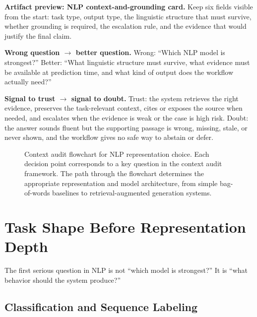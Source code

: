 \begin{thinkingtool}
\textbf{Artifact preview: NLP context-and-grounding card.} Keep six fields visible from the start: task type, output type, the linguistic structure that must survive, whether grounding is required, the escalation rule, and the evidence that would justify the final claim.
\end{thinkingtool}

\begin{thinkingtool}
\textbf{Wrong question $\rightarrow$ better question.} Wrong: ``Which NLP model is strongest?'' Better: ``What linguistic structure must survive, what evidence must be available at prediction time, and what kind of output does the workflow actually need?''
\end{thinkingtool}

\begin{thinkingtool}
\textbf{Signal to trust $\rightarrow$ signal to doubt.} Trust: the system retrieves the right evidence, preserves the task-relevant context, cites or exposes the source when needed, and escalates when the evidence is weak or the case is high risk. Doubt: the answer sounds fluent but the supporting passage is wrong, missing, stale, or never shown, and the workflow gives no safe way to abstain or defer.
\end{thinkingtool}

\begin{figure}[t]
\centering
\resizebox{0.95\linewidth}{!}{}
\caption{Context audit flowchart for NLP representation choice. Each decision point corresponds to a key question in the context audit framework. The path through the flowchart determines the appropriate representation and model architecture, from simple bag-of-words baselines to retrieval-augmented generation systems.}
\label{fig:context-audit-flowchart}
\end{figure}

\section{Task Shape Before Representation Depth}

The first serious question in NLP is not ``which model is strongest?'' It is ``what behavior should the system produce?''

\subsection{Classification and Sequence Labeling}

